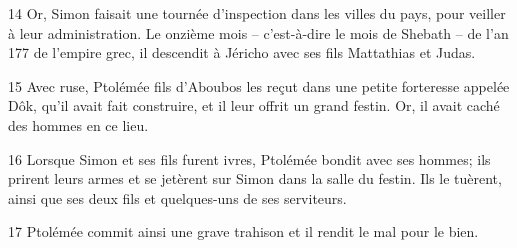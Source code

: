 14 Or, Simon faisait une tournée d’inspection dans les villes du pays, pour veiller à leur administration. Le onzième mois – c’est-à-dire le mois de Shebath – de l’an 177 de l’empire grec, il descendit à Jéricho avec ses fils Mattathias et Judas.

15 Avec ruse, Ptolémée fils d’Aboubos les reçut dans une petite forteresse appelée Dôk, qu’il avait fait construire, et il leur offrit un grand festin. Or, il avait caché des hommes en ce lieu.

16 Lorsque Simon et ses fils furent ivres, Ptolémée bondit avec ses hommes; ils prirent leurs armes et se jetèrent sur Simon dans la salle du festin. Ils le tuèrent, ainsi que ses deux fils et quelques-uns de ses serviteurs.

17 Ptolémée commit ainsi une grave trahison et il rendit le mal pour le bien.
